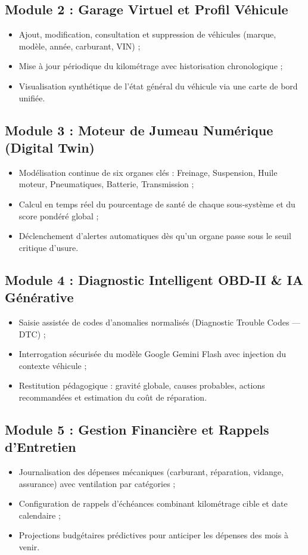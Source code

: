 \documentclass[12pt,a4paper,oneside]{report}
\newcommand{\bpuce}{\textcolor{midBlue}{$\blacktriangleright$}\;}
\begin{document}
\subsection{Module 2 : Garage Virtuel et Profil V\'ehicule}
\begin{itemize}[label=\bpuce]
  \item Ajout, modification, consultation et suppression de v\'ehicules (marque, mod\`ele, ann\'ee, carburant, VIN) ;
  \item Mise \`a jour p\'eriodique du kilom\'etrage avec historisation chronologique ;
  \item Visualisation synth\'etique de l'\'etat g\'en\'eral du v\'ehicule via une carte de bord unifi\'ee.
\end{itemize}

\subsection{Module 3 : Moteur de Jumeau Num\'erique (Digital Twin)}
\begin{itemize}[label=\bpuce]
  \item Mod\'elisation continue de six organes cl\'es : Freinage, Suspension, Huile moteur, Pneumatiques, Batterie, Transmission ;
  \item Calcul en temps r\'eel du pourcentage de sant\'e de chaque sous-syst\`eme et du score pond\'er\'e global ;
  \item D\'eclenchement d'alertes automatiques d\`es qu'un organe passe sous le seuil critique d'usure.
\end{itemize}

\subsection{Module 4 : Diagnostic Intelligent OBD-II \& IA G\'en\'erative}
\begin{itemize}[label=\bpuce]
  \item Saisie assist\'ee de codes d'anomalies normalis\'es (Diagnostic Trouble Codes --- DTC) ;
  \item Interrogation s\'ecuris\'ee du mod\`ele Google Gemini Flash avec injection du contexte v\'ehicule ;
  \item Restitution p\'edagogique : gravit\'e globale, causes probables, actions recommand\'ees et estimation du co\^ut de r\'eparation.
\end{itemize}

\subsection{Module 5 : Gestion Financi\`ere et Rappels d'Entretien}
\begin{itemize}[label=\bpuce]
  \item Journalisation des d\'epenses m\'ecaniques (carburant, r\'eparation, vidange, assurance) avec ventilation par cat\'egories ;
  \item Configuration de rappels d'\'ech\'eances combinant kilom\'etrage cible et date calendaire ;
  \item Projections budg\'etaires pr\'edictives pour anticiper les d\'epenses des mois \`a venir.
\end{itemize}
\end{document}
